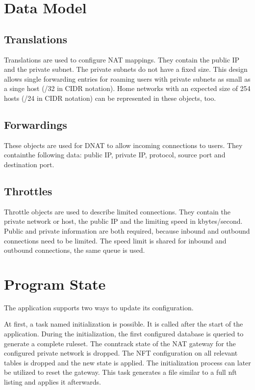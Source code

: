\documentclass{report}
\begin{document}
\section{Data Model}\label{data-model}

\subsection{Translations}\label{translations}

Translations are used to configure NAT mappings. They contain the public
IP and the private subnet. The private subnets do not have a fixed size.
This design allows single forwarding entries for roaming users with
private subnets as small as a singe host (/32 in CIDR notation). Home
networks with an expected size of 254 hosts (/24 in CIDR notation) can
be represented in these objects, too.

\subsection{Forwardings}\label{forwardings}

These objects are used for DNAT to allow incoming connections to users.
They containthe following data: public IP, private IP, protocol, source
port and destination port.

\subsection{Throttles}\label{throttles}

Throttle objects are used to describe limited connections. They contain
the private network or host, the public IP and the limiting speed in
kbytes/second. Public and private information are both required, because
inbound and outbound connections need to be limited. The speed limit is
shared for inbound and outbound connections, the same queue is used.

\section{Program State}\label{program-state}

The application supports two ways to update its configuration.

At first, a task named initialization is possible. It is called after
the start of the application. During the initialization, the first
configured database is queried to generate a complete ruleset. The
conntrack state of the NAT gateway for the configured private network is
dropped. The NFT configuration on all relevant tables is dropped and the
new state is applied. The initialization process can later be utilized
to reset the gateway. This task generates a file similar to a full nft
listing and applies it afterwards.
\end{document}
